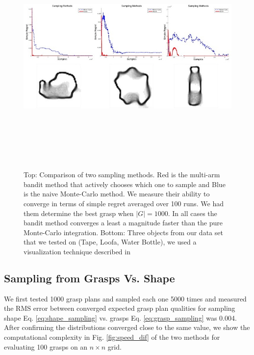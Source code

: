 \documentclass[letterpaper, 10 pt, conference]{ieeeconf}  %
\begin{document}
\begin{figure}[ht!]
\centering
\includegraphics[width = 17cm, height = 12cm]{figures/Slide09.jpg}
\caption{ \footnotesize Top: Comparison of two sampling methods. Red is the multi-arm bandit method that actively chooses which one to sample and Blue is the naive Monte-Carlo method. We measure their ability to converge in terms of simple regret averaged over 100 runs. We had them determine the best grasp when $|G|=1000$. In all cases the bandit method converges a least a magnitude faster than the pure Monte-Carlo integration. Bottom: Three objects from our data set that we tested on (Tape, Loofa, Water Bottle), we used a visualization technique described in \cite{jeffs}}
\vspace*{-10pt}
\label{fig:simple_regret}
\end{figure}


\subsection{Sampling from Grasps Vs. Shape}
We first tested 1000 grasp plans and sampled each one 5000 times  and measured the RMS error between converged expected grasp plan qualities for sampling shape Eq. \ref{eq:shape_sampling} vs. grasps  Eq. \ref{eq:grasp_sampling} was 0.004. After confirming the distributions converged close to the same value, we show the computational complexity in Fig. \ref{fig:speed_dif} of the two methods for evaluating 100 grasps on an $n \times n$ grid. 
\end{document}

